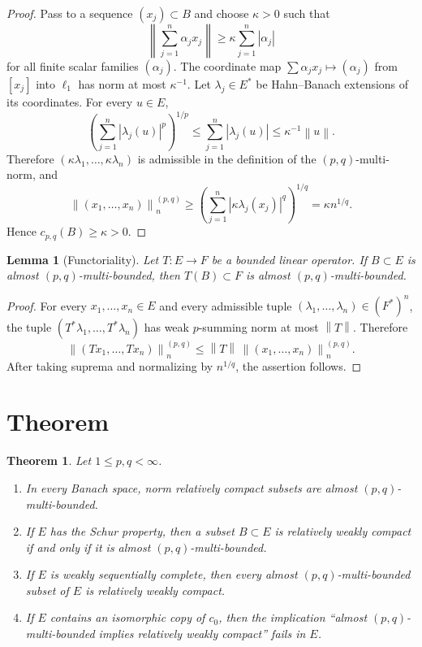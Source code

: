 \documentclass[11pt]{article}
\newtheorem{theorem}{Theorem}
\newtheorem{lemma}{Lemma}
\newcommand{\norm}[1]{\left\lVert #1 \right\rVert}
\begin{document}
\begin{proof}
Pass to a sequence \((x_j)\subset B\) and choose \(\kappa>0\) such that
\[
  \norm{\sum_{j=1}^n \alpha_j x_j}\ge
  \kappa\sum_{j=1}^n |\alpha_j|
\]
for all finite scalar families \((\alpha_j)\).  The coordinate map
\(\sum \alpha_jx_j\mapsto(\alpha_j)\) from \([x_j]\) into \(\ell_1\) has norm
at most \(\kappa^{-1}\).  Let \(\lambda_j\in E^*\) be Hahn--Banach extensions
of its coordinates.  For every \(u\in E\),
\[
  \left(\sum_{j=1}^n |\lambda_j(u)|^p\right)^{1/p}
  \le \sum_{j=1}^n |\lambda_j(u)|
  \le \kappa^{-1}\norm{u}.
\]
Therefore \((\kappa\lambda_1,\ldots,\kappa\lambda_n)\) is admissible in the
definition of the \((p,q)\)-multi-norm, and
\[
  \norm{(x_1,\ldots,x_n)}^{(p,q)}_n
  \ge
  \left(\sum_{j=1}^n|\kappa\lambda_j(x_j)|^q\right)^{1/q}
  =\kappa n^{1/q}.
\]
Hence \(c_{p,q}(B)\ge \kappa>0\).
\end{proof}

\begin{lemma}[Functoriality]
\label{lem:operator}
Let \(T:E\to F\) be a bounded linear operator.  If \(B\subset E\) is almost
\((p,q)\)-multi-bounded, then \(T(B)\subset F\) is almost
\((p,q)\)-multi-bounded.
\end{lemma}

\begin{proof}
For every \(x_1,\ldots,x_n\in E\) and every admissible tuple
\((\lambda_1,\ldots,\lambda_n)\in (F^*)^n\), the tuple
\((T^*\lambda_1,\ldots,T^*\lambda_n)\) has weak \(p\)-summing norm at most
\(\norm{T}\).  Therefore
\[
  \norm{(Tx_1,\ldots,Tx_n)}^{(p,q)}_n
  \le \norm{T}\,\norm{(x_1,\ldots,x_n)}^{(p,q)}_n.
\]
After taking suprema and normalizing by \(n^{1/q}\), the assertion follows.
\end{proof}

\section*{Theorem}

\begin{theorem}
\label{thm:main}
Let \(1\le p,q<\infty\).
\begin{enumerate}[label=\rm(\alph*)]
\item In every Banach space, norm relatively compact subsets are almost
\((p,q)\)-multi-bounded.
\item If \(E\) has the Schur property, then a subset \(B\subset E\) is
relatively weakly compact if and only if it is almost
\((p,q)\)-multi-bounded.
\item If \(E\) is weakly sequentially complete, then every almost
\((p,q)\)-multi-bounded subset of \(E\) is relatively weakly compact.
\item If \(E\) contains an isomorphic copy of \(c_0\), then the implication
``almost \((p,q)\)-multi-bounded implies relatively weakly compact'' fails in
\(E\).
\end{enumerate}
\end{theorem}
\end{document}
